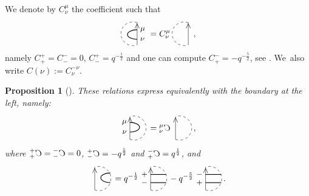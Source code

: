 \documentclass[pdftex]{sigma}%
\numberwithin{equation}{section}
\newtheorem{Proposition}[Theorem]{Proposition}
 { \theoremstyle{definition}
\newtheorem{Definition}[Theorem]{Definition}
\newtheorem{Note}[Theorem]{Note}
\newtheorem{Example}[Theorem]{Example}
\newtheorem{Remark}[Theorem]{Remark} }
\begin{document}
\begin{Definition}
We denote by $C^\mu_\nu$ the coefficient such that
\[
\begin{tikzpicture}[scale = 0.5, baseline = -3pt]
\draw[dashed] (70:1) arc(70:290:1);
\draw (-70:1) -- (70:1) node[pos = 0.85,sloped]{\small $>$};
\draw[thick] (70:1)++ (0,-0.6) node[right]{\small $\mu$} arc(90:270:0.8 and 0.4) node[right]{\small $\nu$};
\end{tikzpicture} = C^\mu_\nu \begin{tikzpicture}[scale = 0.5, baseline = -3pt]
\draw[dashed] (70:1) arc(70:290:1);
\draw (-70:1) -- (70:1) node[pos = 0.85,sloped]{\small $>$};
\end{tikzpicture},
\]
namely $C_+^+ = C_-^- = 0$, $C^+_-=q^{-\frac{1}{2}}$ and one can compute $C^-_+ = -q^{-\frac{5}{2}}$, see \cite[Lemma~2.3(13)]{Cos}. We~also write $C(\nu) := C_\nu^{-\nu}$.
\end{Definition}

\begin{Proposition}[{\cite[Lemmas 2.3 and 2.4]{TTQLe}}] \label{propLeftStSkRel}
These relations express equivalently with the boundary at the left, namely:
\[
\begin{tikzpicture}[scale = 0.5, baseline = -3pt, rotate = 180]
\draw[dashed] (70:1) arc(70:290:1);
\draw (-70:1) -- (70:1) node[pos = 0.15,sloped]{\small $>$};
\draw[thick] (70:1)++ (0,-0.6) node[left]{\small $\nu$} arc(90:270:0.8 and 0.4) node[left]{\small $\mu$};
\end{tikzpicture} = {}^{\mu}_{\nu}\reflectbox{$C$} \begin{tikzpicture}[scale = 0.5, baseline = -3pt, rotate = 180]
\draw[dashed] (70:1) arc(70:290:1);
\draw (-70:1) -- (70:1) node[pos = 0.15,sloped]{\small $>$};
\end{tikzpicture},
\]
where ${}^+_+ \reflectbox{$C$} = {}^-_-\reflectbox{$C$}=0$, ${}^+_-\reflectbox{$C$}= -q^{\frac{5}{2}}$ and ${}^-_+\reflectbox{$C$}= q^{\frac{1}{2}}$, and
\[
\begin{tikzpicture}[scale = 0.5, baseline = -3pt, rotate = 180]
\draw[dashed] (70:1) arc(70:290:1);
\draw (-70:1) -- (70:1) node[pos = 0.15,sloped]{\small $>$};
\draw[thick] (70:1)++ (-1.3,-0.6) arc(90:-90:0.8 and 0.4);
\end{tikzpicture} = q^{-\frac{1}{2}} \begin{tikzpicture}[scale = 0.5, baseline = -3pt, rotate = 180]
\draw[dashed] (70:1) arc(70:290:1);
\draw (-70:1) -- (70:1) node[pos = 0.15,sloped]{\small $>$};
\draw[thick] (70:1)++ (0,-0.6) node[left]{\small $-$} -- ++(-1.3,0);
\draw[thick] (-70:1)++ (0,0.6) node[left]{\small $+$} -- ++(-1.3,0);
\end{tikzpicture} -q^{-\frac{5}{2}} \begin{tikzpicture}[scale = 0.5, baseline = -3pt, rotate = 180]
\draw[dashed] (70:1) arc(70:290:1);
\draw (-70:1) -- (70:1) node[pos = 0.15,sloped]{\small $>$};
\draw[thick] (70:1)++ (0,-0.6) node[left]{\small $+$} -- ++(-1.3,0);
\draw[thick] (-70:1)++ (0,0.6) node[left]{\small $-$} -- ++(-1.3,0);
\end{tikzpicture}.
\]
\end{Proposition}
\end{document}
